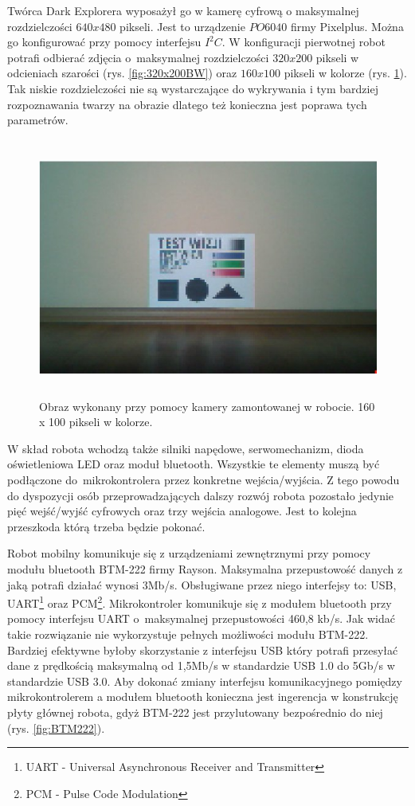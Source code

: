 Twórca Dark Explorera wyposażył go w kamerę cyfrową o maksymalnej rozdzielczości
$640x480$ pikseli. Jest to urządzenie $PO6040$ firmy Pixelplus. Można go
konfigurować przy pomocy interfejsu $I^{2}C$. W konfiguracji pierwotnej robot
potrafi odbierać zdjęcia o~maksymalnej rozdzielczości $320x200$ pikseli w
odcieniach szarości (rys. \ref{fig:320x200BW}) oraz $160x100$ pikseli w kolorze
(rys. \ref{fig:160x100C}). Tak niskie rozdzielczości nie są wystarczające do
wykrywania i tym bardziej rozpoznawania twarzy na obrazie dlatego też konieczna
jest poprawa tych parametrów.

\begin{figure}[!h]
 \centering
 \includegraphics[height=85mm]{../images/ch02/160x100C.jpg}
 \caption{Obraz wykonany przy pomocy kamery zamontowanej w robocie. 160 x 100 pikseli w kolorze. \cite{KmakMScThesis2009}}
 \label{fig:160x100C}
\end{figure}

W skład robota wchodzą także silniki napędowe, serwomechanizm, dioda
oświetleniowa LED oraz moduł bluetooth. Wszystkie te elementy muszą być
podłączone do~mikrokontrolera przez konkretne wejścia/wyjścia. Z tego powodu do dyspozycji osób
przeprowadzających dalszy rozwój robota pozostało jedynie pięć wejść/wyjść
cyfrowych oraz trzy wejścia analogowe. Jest to kolejna przeszkoda którą trzeba
będzie pokonać.

Robot mobilny komunikuje się z urządzeniami zewnętrznymi przy pomocy modułu
bluetooth BTM-222 firmy Rayson. Maksymalna przepustowość danych z jaką potrafi
działać wynosi 3Mb/s. Obsługiwane przez niego interfejsy to: USB,
UART\footnote{UART - Universal Asynchronous Receiver and Transmitter} oraz
PCM\footnote{PCM - Pulse Code Modulation}. Mikrokontroler komunikuje się z
modułem bluetooth przy pomocy interfejsu UART o~maksymalnej przepustowości 460,8 kb/s. Jak widać takie rozwiązanie nie wykorzystuje pełnych możliwości modułu BTM-222. Bardziej efektywne byłoby skorzystanie z interfejsu USB który potrafi przesyłać dane z prędkością
maksymalną od 1,5Mb/s w standardzie USB 1.0 do 5Gb/s w standardzie USB 3.0. Aby
dokonać zmiany interfejsu komunikacyjnego pomiędzy mikrokontrolerem a modułem
bluetooth konieczna jest ingerencja w konstrukcję płyty głównej robota, gdyż
BTM-222 jest przylutowany bezpośrednio do niej (rys. \ref{fig:BTM222}).

